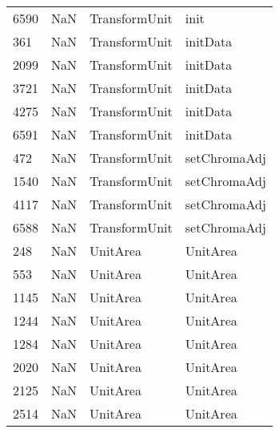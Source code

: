 \begin{tabular}{llll}
6590 &                   NaN &              TransformUnit &                                      init \\
361  &                   NaN &              TransformUnit &                                  initData \\
2099 &                   NaN &              TransformUnit &                                  initData \\
3721 &                   NaN &              TransformUnit &                                  initData \\
4275 &                   NaN &              TransformUnit &                                  initData \\
6591 &                   NaN &              TransformUnit &                                  initData \\
472  &                   NaN &              TransformUnit &                              setChromaAdj \\
1540 &                   NaN &              TransformUnit &                              setChromaAdj \\
4117 &                   NaN &              TransformUnit &                              setChromaAdj \\
6588 &                   NaN &              TransformUnit &                              setChromaAdj \\
248  &                   NaN &                   UnitArea &                                  UnitArea \\
553  &                   NaN &                   UnitArea &                                  UnitArea \\
1145 &                   NaN &                   UnitArea &                                  UnitArea \\
1244 &                   NaN &                   UnitArea &                                  UnitArea \\
1284 &                   NaN &                   UnitArea &                                  UnitArea \\
2020 &                   NaN &                   UnitArea &                                  UnitArea \\
2125 &                   NaN &                   UnitArea &                                  UnitArea \\
2514 &                   NaN &                   UnitArea &                                  UnitArea \\

\end{tabular}

